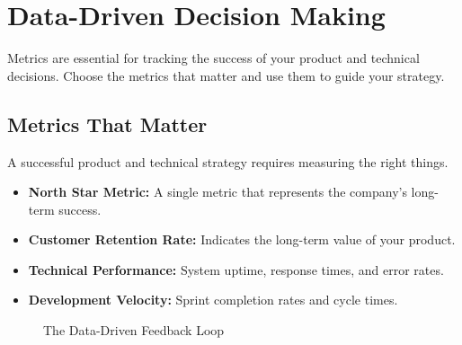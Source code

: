 \section{Data-Driven Decision Making}

Metrics are essential for tracking the success of your product and technical decisions. Choose the metrics that matter and use them to guide your strategy.

\subsection{Metrics That Matter}

A successful product and technical strategy requires measuring the right things.

\begin{itemize}
    \item \textbf{North Star Metric:} A single metric that represents the company's long-term success.
    \item \textbf{Customer Retention Rate:} Indicates the long-term value of your product.
    \item \textbf{Technical Performance:} System uptime, response times, and error rates.
    \item \textbf{Development Velocity:} Sprint completion rates and cycle times.
\end{itemize}

\begin{figure}[h]
    \centering
    \caption{The Data-Driven Feedback Loop}
    \label{fig:data_loop}
\end{figure}

